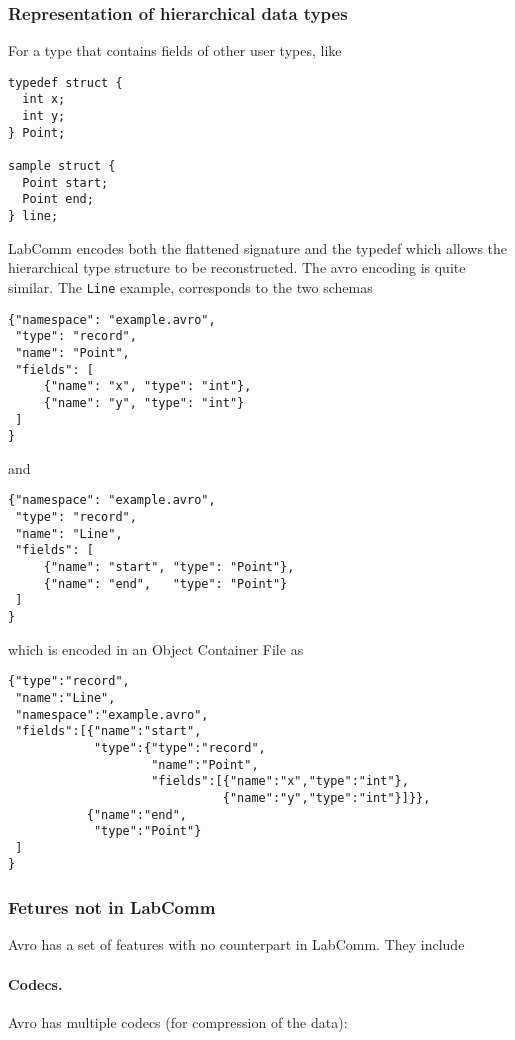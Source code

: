 \documentclass[a4paper]{article}
\begin{document}
\subsubsection{Representation of hierarchical data types}

For a type that contains fields of other user types, like
\begin{verbatim}
typedef struct {
  int x;
  int y;
} Point;

sample struct {
  Point start;
  Point end;
} line;
\end{verbatim}

LabComm encodes both the flattened signature and the 
typedef which allows the hierarchical type structure to be
reconstructed.
%
The avro encoding is quite similar. 
The \verb+Line+ example, corresponds to the two schemas
\begin{verbatim}
{"namespace": "example.avro",
 "type": "record",
 "name": "Point",
 "fields": [
     {"name": "x", "type": "int"},
     {"name": "y", "type": "int"}
 ]
}
\end{verbatim}
and
\begin{verbatim}
{"namespace": "example.avro",
 "type": "record",
 "name": "Line",
 "fields": [
     {"name": "start", "type": "Point"},
     {"name": "end",   "type": "Point"}
 ]
}
\end{verbatim}
which is encoded in an Object Container File as
\begin{verbatim}
{"type":"record",
 "name":"Line",
 "namespace":"example.avro",
 "fields":[{"name":"start",
            "type":{"type":"record",
                    "name":"Point",
                    "fields":[{"name":"x","type":"int"},
                              {"name":"y","type":"int"}]}},
           {"name":"end",
            "type":"Point"}
 ]
}
\end{verbatim}
\subsubsection{Fetures not in LabComm} 

Avro has a set of features with no counterpart in LabComm. They include

\paragraph{Codecs.}

Avro has multiple codecs (for compression of the data):
\end{document}
